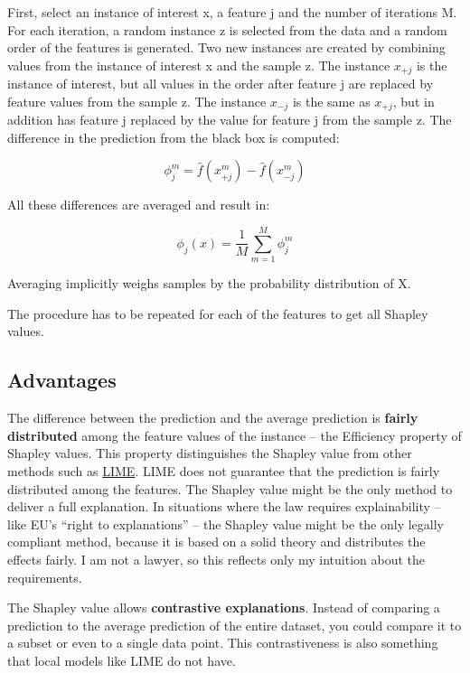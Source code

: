\documentclass[
  11pt,
]{scrbook}
\begin{document}
First, select an instance of interest x, a feature j and the number of iterations M.
For each iteration, a random instance z is selected from the data and a random order of the features is generated.
Two new instances are created by combining values from the instance of interest x and the sample z.
The instance \(x_{+j}\) is the instance of interest, but all values in the order after feature j are replaced by feature values from the sample z.
The instance \(x_{-j}\) is the same as \(x_{+j}\), but in addition has feature j replaced by the value for feature j from the sample z.
The difference in the prediction from the black box is computed:

\[\phi_j^{m}=\hat{f}(x^m_{+j})-\hat{f}(x^m_{-j})\]

All these differences are averaged and result in:

\[\phi_j(x)=\frac{1}{M}\sum_{m=1}^M\phi_j^{m}\]

Averaging implicitly weighs samples by the probability distribution of X.

The procedure has to be repeated for each of the features to get all Shapley values.

\hypertarget{advantages-16}{%
\subsection{Advantages}\label{advantages-16}}

The difference between the prediction and the average prediction is \textbf{fairly distributed} among the feature values of the instance -- the Efficiency property of Shapley values.
This property distinguishes the Shapley value from other methods such as \protect\hyperlink{lime}{LIME}.
LIME does not guarantee that the prediction is fairly distributed among the features.
The Shapley value might be the only method to deliver a full explanation.
In situations where the law requires explainability -- like EU's ``right to explanations'' -- the Shapley value might be the only legally compliant method, because it is based on a solid theory and distributes the effects fairly.
I am not a lawyer, so this reflects only my intuition about the requirements.

The Shapley value allows \textbf{contrastive explanations}.
Instead of comparing a prediction to the average prediction of the entire dataset, you could compare it to a subset or even to a single data point.
This contrastiveness is also something that local models like LIME do not have.
\end{document}
